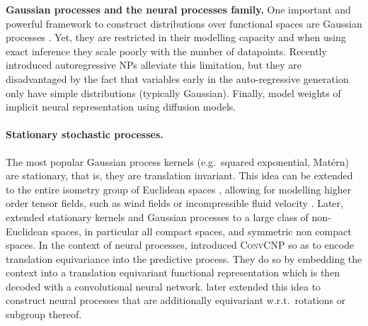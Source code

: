 \textbf{Gaussian processes and the neural processes family.}
One important and powerful framework to construct distributions over functional spaces are Gaussian processes \parencite{rasmussen2003gaussian}.
Yet, they are restricted in their modelling capacity and when using exact inference they scale poorly with the number of datapoints.
Recently introduced autoregressive NPs \parencite{bruinsma2023Autoregressive} alleviate this limitation, but they are disadvantaged by the fact that variables early in the auto-regressive generation only have simple distributions (typically Gaussian).
Finally, \cite{dupont2022data} model weights of implicit neural representation using diffusion models.

\paragraph{Stationary stochastic processes.}
The most popular Gaussian process kernels (e.g.\ squared exponential, Mat\'ern) are stationary, that is, they are translation invariant.
This idea can be extended to the entire isometry group of Euclidean spaces \parencite{holderrieth2021equivariant}, allowing for modelling higher order tensor fields, such as wind fields or incompressible fluid velocity \parencite{macedo2010learning}.
Later, \textcite{azangulov2023stationary, azangulov2023stationary2} extended stationary kernels and Gaussian processes to a large class of non-Euclidean spaces, in particular all compact spaces, and symmetric non compact spaces.
In the context of neural processes, \cite{gordon2019Convolutional} introduced \textsc{ConvCNP} so as to encode translation equivariance into the predictive process.
They do so by embedding the context into a translation equivariant functional representation which is then decoded with a convolutional neural network.
\textcite{holderrieth2021equivariant} later extended this idea to construct neural processes that are additionally equivariant w.r.t.\ rotations or subgroup thereof.

